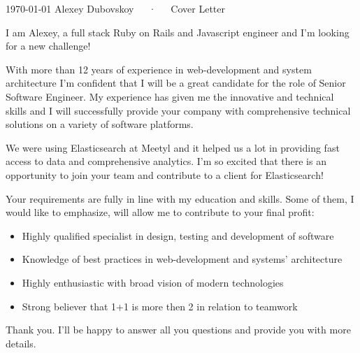 \documentclass[11pt, a4paper]{awesome-cv}
\begin{document}
\makecvheader[R]

\makecvfooter
  {\today}
  {Alexey Dubovskoy~~~·~~~Cover Letter}
  {}

\makelettertitle

\begin{cvletter}


I am Alexey, a full stack Ruby on Rails and Javascript engineer and I'm looking for a new challenge!



With more than 12 years of experience in web-development and system architecture I'm confident that I will be a great candidate for the role of Senior Software Engineer. My experience has given me the innovative and technical skills and I will successfully provide your company with comprehensive technical solutions on a variety of software platforms.


We were using Elasticsearch at Meetyl and it helped us a lot in providing fast access to data and comprehensive analytics. I'm so excited that there is an opportunity to join your team and contribute to a client for Elasticsearch!


Your requirements are fully in line with my education and skills. Some of them, I would like to emphasize, will allow me to contribute to your final profit:

\begin{itemize}
  \item  Highly qualified specialist in design, testing and development of software
  \item Knowledge of best practices in web-development and systems' architecture
  \item Highly enthusiastic with broad vision of modern technologies
  \item Strong believer that 1+1 is more then 2 in relation to teamwork
\end{itemize}

Thank you. I'll be happy to answer all you questions and provide you with more details.


\end{cvletter}


\makeletterclosing
\end{document}
